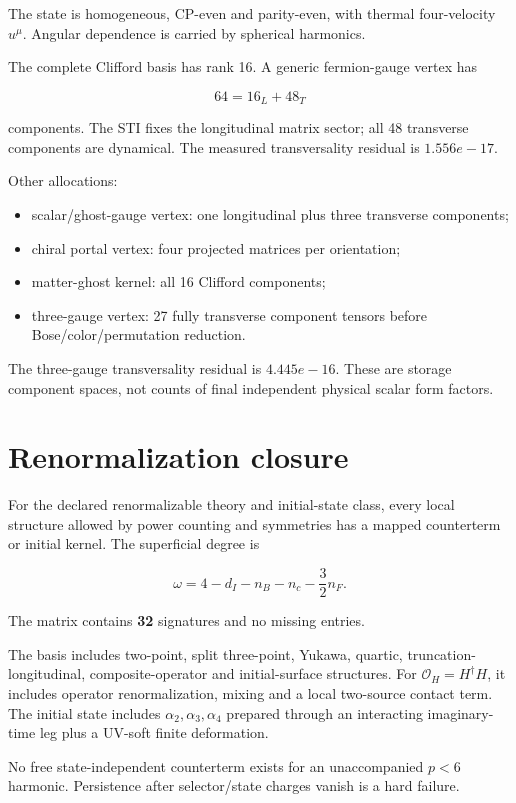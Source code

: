 \documentclass[
  10pt,
]{article}
\providecommand{\tightlist}{%
  \setlength{\itemsep}{0pt}\setlength{\parskip}{0pt}}
\begin{document}
The state is homogeneous, CP-even and parity-even, with thermal
four-velocity \(u^\mu\). Angular dependence is carried by spherical
harmonics.

The complete Clifford basis has rank 16. A generic fermion-gauge vertex
has

\[
64=16_L+48_T
\]

components. The STI fixes the longitudinal matrix sector; all 48
transverse components are dynamical. The measured transversality
residual is \(1.556e-17\).

Other allocations:

\begin{itemize}
\tightlist
\item
  scalar/ghost-gauge vertex: one longitudinal plus three transverse
  components;
\item
  chiral portal vertex: four projected matrices per orientation;
\item
  matter-ghost kernel: all 16 Clifford components;
\item
  three-gauge vertex: 27 fully transverse component tensors before
  Bose/color/permutation reduction.
\end{itemize}

The three-gauge transversality residual is \(4.445e-16\). These are
storage component spaces, not counts of final independent physical
scalar form factors.

\section{Renormalization closure}\label{renormalization-closure}

For the declared renormalizable theory and initial-state class, every
local structure allowed by power counting and symmetries has a mapped
counterterm or initial kernel. The superficial degree is

\[
\omega=4-d_I-n_B-n_c-\frac32n_F.
\]

The matrix contains \textbf{32} signatures and no missing entries.

The basis includes two-point, split three-point, Yukawa, quartic,
truncation-longitudinal, composite-operator and initial-surface
structures. For \(\mathcal O_H=H^\dagger H\), it includes operator
renormalization, mixing and a local two-source contact term. The initial
state includes \(\alpha_2,\alpha_3,\alpha_4\) prepared through an
interacting imaginary-time leg plus a UV-soft finite deformation.

No free state-independent counterterm exists for an unaccompanied
\(p<6\) harmonic. Persistence after selector/state charges vanish is a
hard failure.
\end{document}
